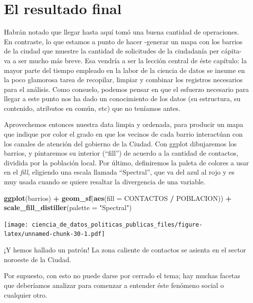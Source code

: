 \documentclass[]{book}
\newenvironment{Shaded}{\begin{snugshade}}{\end{snugshade}}
\newcommand{\KeywordTok}[1]{\textcolor[rgb]{0.13,0.29,0.53}{\textbf{#1}}}
\newcommand{\DataTypeTok}[1]{\textcolor[rgb]{0.13,0.29,0.53}{#1}}
\newcommand{\StringTok}[1]{\textcolor[rgb]{0.31,0.60,0.02}{#1}}
\newcommand{\OperatorTok}[1]{\textcolor[rgb]{0.81,0.36,0.00}{\textbf{#1}}}
\newcommand{\NormalTok}[1]{#1}
\begin{document}
\section{El resultado final}\label{el-resultado-final}

Habrán notado que llegar hasta aquí tomó una buena cantidad de
operaciones. En contraste, lo que estamos a punto de hacer -generar un
mapa con los barrios de la ciudad que muestre la cantidad de solicitudes
de la ciudadanía per cápita- va a ser mucho más breve. Esa vendría a ser
la lección central de éste capítulo: la mayor parte del tiempo empleado
en la labor de la ciencia de datos se insume en la poco glamorosa tarea
de recopilar, limpiar y combinar los registros necesarios para el
análisis. Como consuelo, podemos pensar en que el esfuerzo necesario
para llegar a este punto nos ha dado un conocimiento de los datos (su
estructura, su contenido, atributos en común, etc) que no teníamos
antes.

Aprovechemos entonces nuestra data limpia y ordenada, para producir un
mapa que indique por color el grado en que los vecinos de cada barrio
interactúan con los canales de atención del gobierno de la Ciudad. Con
ggplot dibujaremos los barrios, y pintaremos su interior (``fill'') de
acuerdo a la cantidad de contactos, dividida por la población local. Por
último, definiremos la paleta de colores a usar en el \emph{fill},
eligiendo una escala llamada ``Spectral'', que va del azul al rojo y es
muy usada cuando se quiere resaltar la divergencia de una variable.

\begin{Shaded}
\begin{Highlighting}[]
\KeywordTok{ggplot}\NormalTok{(barrios) }\OperatorTok{+}
\StringTok{    }\KeywordTok{geom_sf}\NormalTok{(}\KeywordTok{aes}\NormalTok{(}\DataTypeTok{fill =}\NormalTok{ CONTACTOS }\OperatorTok{/}\StringTok{ }\NormalTok{POBLACION)) }\OperatorTok{+}
\StringTok{    }\KeywordTok{scale_fill_distiller}\NormalTok{(}\DataTypeTok{palette =} \StringTok{"Spectral"}\NormalTok{)}
\end{Highlighting}
\end{Shaded}

\texttt{[image: ciencia\_de\_datos\_politicas\_publicas\_files/figure-latex/unnamed-chunk-30-1.pdf]}

¡Y hemos hallado un patrón! La zona caliente de contactos se asienta en
el sector noroeste de la Ciudad.

Por supuesto, con esto no puede darse por cerrado el tema; hay muchas
facetas que deberíamos analizar para comenzar a entender éste fenómeno
social o cualquier otro.
\end{document}
